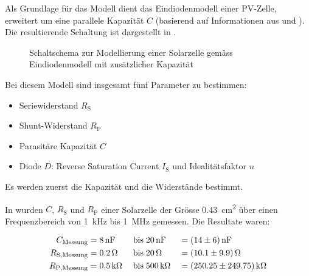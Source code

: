 Als  Grundlage f\"ur  das  Modell dient  das  Eindiodenmodell einer  PV-Zelle,
erweitert  um  eine parallele  Kapazit\"at  $C$  (basierend auf  Informationen
aus \cite{ref:solar:scofield} und \cite{ref:solar:friesen}). Die resultierende
Schaltung ist dargestellt in .

\clearpage
\begin{figure}[h!tb]
    \centering
    
    \caption{%
        Schaltschema    zur    Modellierung    einer    Solarzelle    gem\"ass
        Eindiodenmodell mit zus\"atzlicher Kapazit\"at%
    }
    \label{fig:circuit:solarCell}
\end{figure}

Bei diesem Modell sind insgesamt f\"unf Parameter zu bestimmen:

\begin{itemize}
    \firmlist
    \item
        Seriewiderstand $R_{\mathrm{S}}$
    \item
        Shunt-Widerstand $R_{\mathrm{P}}$
    \item
        Parasit\"are Kapazit\"at $C$
    \item
        Diode   $D$: Reverse    Saturation   Current    $I_{\mathrm{S}}$   und
        Idealit\"atsfaktor $n$
\end{itemize}

Es werden zuerst die Kapazit\"at und die Widerst\"ande bestimmt.

\myfancybreak

In \cite{ref:solar:scofield} wurden $C$, $R_{\mathrm{S}}$ und $R_{\mathrm{P}}$
einer  Solarzelle der  Gr\"osse  \SI{0.43}{\centi\meter\squared} \"uber  einen
Frequenzbereich  von \SI{1}{\kilo\hertz} bis \SI{1}{\mega\hertz} gemessen. Die
Resultate waren:

\begin{alignat}{3}
    \label{eq:scofield:C}
    C_{\mathrm{Messung}}    &= \SI{8}{\nano\farad} \; & \text{bis} \; & \SI{20}{\nano\farad} \;  & = & \; \SI{14 \pm 6}{\nano\farad} \\
    \label{eq:scofield:Rs}
    R_{\mathrm{S, Messung}} &= \SI{0.2}{\ohm}      \; & \text{bis} \; & \SI{20}{\ohm}        \;  & = & \; \SI{10.1 \pm 9.9}{\ohm}     \\
    \label{eq:scofield:Rp}
    R_{\mathrm{P, Messung}} &= \SI{0.5}{\kilo\ohm} \; & \text{bis} \; & \SI{500}{\kilo\ohm}  \;  & = & \; \SI{250.25 \pm 249.75}{\kilo\ohm}
\end{alignat}


